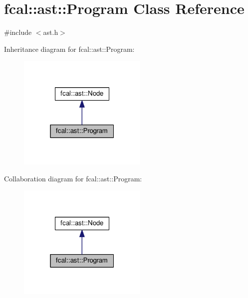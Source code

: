 \hypertarget{classfcal_1_1ast_1_1Program}{}\section{fcal\+:\+:ast\+:\+:Program Class Reference}
\label{classfcal_1_1ast_1_1Program}


{\ttfamily \#include $<$ast.\+h$>$}



Inheritance diagram for fcal\+:\+:ast\+:\+:Program\+:\nopagebreak
\begin{figure}[H]
\begin{center}
\leavevmode
\includegraphics[width=175pt]{classfcal_1_1ast_1_1Program__inherit__graph}
\end{center}
\end{figure}


Collaboration diagram for fcal\+:\+:ast\+:\+:Program\+:\nopagebreak
\begin{figure}[H]
\begin{center}
\leavevmode
\includegraphics[width=175pt]{classfcal_1_1ast_1_1Program__coll__graph}
\end{center}
\end{figure}
